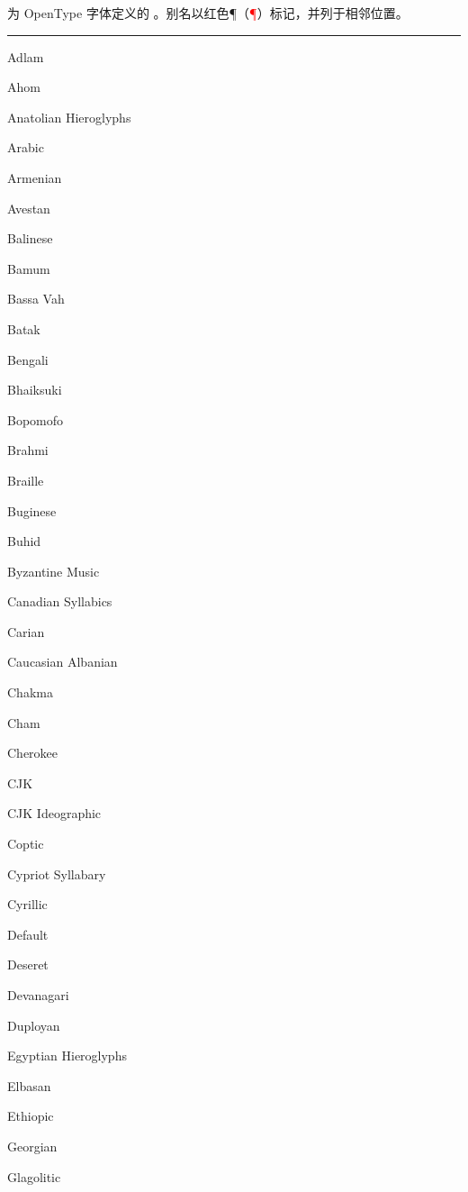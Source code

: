 \documentclass[a4paper]{l3doc}
\begin{document}
\begin{table}[!hbp]
  \caption{为 OpenType 字体定义的 。别名以红色¶（{\sffamily\textcolor{red}{\P}}）标记，并列于相邻位置。}
  \label{tab:ot-scpt}
\def\dup{\makebox[0pt][r]{\textcolor{red}{\P}}}
\setlength\columnseprule{0pt}
  \hrule
  \begin{multicols}{4}\setlength\parindent{0pt}
    \sffamily\scriptsize
    Adlam \par
    Ahom \par
    Anatolian Hieroglyphs \par
    Arabic \par
    Armenian \par
    Avestan \par
    Balinese \par
    Bamum \par
    Bassa Vah \par
    Batak \par
    Bengali \par
    Bhaiksuki \par
    Bopomofo \par
    Brahmi \par
    Braille \par
    Buginese \par
    Buhid \par
    Byzantine Music \par
    Canadian Syllabics \par
    Carian \par
    Caucasian Albanian \par
    Chakma \par
    Cham \par
    Cherokee \par
    \dup CJK \par
    \dup CJK Ideographic \par
    Coptic \par
    Cypriot Syllabary \par
    Cyrillic \par
    Default \par
    Deseret \par
    Devanagari \par
    Duployan \par
    Egyptian Hieroglyphs \par
    Elbasan \par
    Ethiopic \par
    Georgian \par
    Glagolitic \par

\end{multicols}
\end{table}
\end{document}
